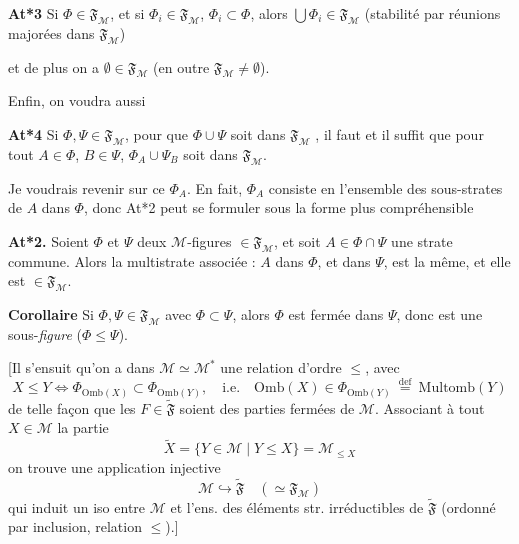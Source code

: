\documentclass[11pt,a4paper]{article}
\begin{document}

\textbf{At*3} Si $\Phi \in \mathfrak{F}_{\mathcal{M}}$, et si $\Phi_i \in \mathfrak{F}_{\mathcal{M}}$, $\Phi_i \subset \Phi$, alors $\bigcup \Phi_i \in \mathfrak{F}_{\mathcal{M}}$ (stabilité par réunions majorées dans $\mathfrak{F}_{\mathcal{M}}$)


et de plus on a $\emptyset \in \mathfrak{F}_{\mathcal{M}}$ (en outre $\mathfrak{F}_{\mathcal{M}} \neq \emptyset$).

Enfin, on voudra aussi

\textbf{At*4} Si $\Phi, \Psi \in \mathfrak{F}_{\mathcal{M}}$, pour que $\Phi \cup \Psi$ soit  dans $\mathfrak{F}_{\mathcal{M}}$ , il faut et il suffit que pour tout $A \in \Phi$, $B \in \Psi$, $\Phi_A \cup \Psi_B$ soit dans $\mathfrak{F}_{\mathcal{M}}$.

Je voudrais revenir sur ce $\Phi_A$. En fait, $\Phi_A$ consiste en l'ensemble des sous-strates de $A$ dans $\Phi$, donc At*2 peut se formuler sous la forme plus compréhensible

\textbf{At*2.} Soient $\Phi$ et $\Psi$ deux $\mathcal{M}$-figures $\in \mathfrak{F}_{\mathcal{M}}$, et soit $A \in \Phi \cap \Psi$ une strate commune. Alors la multistrate associée : $A$ dans $\Phi$, et dans $\Psi$, est la même, et elle est $\in \mathfrak{F}_{\mathcal{M}}$.

\textbf{Corollaire} Si $\Phi, \Psi \in \mathfrak{F}_{\mathcal{M}}$ avec $\Phi \subset \Psi$, alors $\Phi$ est fermée dans $\Psi$, donc est une sous-\emph{figure} ($\Phi \leq \Psi$).

[Il s'ensuit qu'on a dans $\mathcal{M} \simeq \mathcal{M}^{*}$ une relation d'ordre $\leq$, avec
\[
  X \leq Y \Longleftrightarrow \Phi_{\mathrm{Omb}(X)} \subset \Phi_{\mathrm{Omb}(Y)}, \quad \text{i.e.} \quad \mathrm{Omb}(X) \in \Phi_{\mathrm{Omb}(Y)} \ \overset{\mathrm{def}}{=}\ \mathrm{Multomb}(Y)
\]
de telle façon que les  $F \in \widetilde{\mathfrak{F}}$ soient des parties fermées de $\mathcal{M}$. Associant à tout $X \in \mathcal{M}$ la partie
\[
  \widetilde{X} = \lbrace Y \in \mathcal{M} \mid Y \leq X \rbrace = \mathcal{M}_{\leq X}
\]
on trouve une application injective
\[
  \mathcal{M} \hookrightarrow \widetilde{\mathfrak{F}} \quad (\simeq \mathfrak{F}_{\mathcal{M}})
\]
qui induit un iso entre $\mathcal{M}$ et l'ens. des éléments str. irréductibles de $\widetilde{\mathfrak{F}}$ (ordonné par inclusion, relation $\leq$).]
\end{document}
